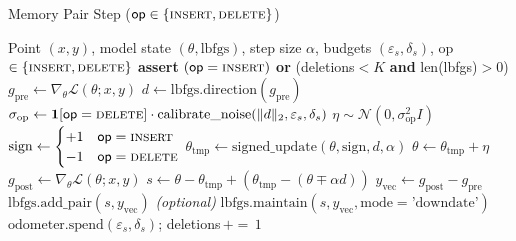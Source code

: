 \documentclass{article}
\theoremstyle{ssltheorem}
\begin{document}
\begin{algorithm}
\caption{Memory Pair Step ($\mathsf{op}\in\{\textsc{insert},\textsc{delete}\}$)}
\label{alg:pair-step}
\begin{algorithmic}
\Require Point $(x,y)$, model state $(\theta,\mathrm{lbfgs})$, step size $\alpha$, budgets $(\varepsilon_s,\delta_s)$, op $\in\{\textsc{insert},\textsc{delete}\}$
\State \textbf{assert} $(\mathsf{op}=\textsc{insert})$ \textbf{or} (deletions$<K$ \textbf{and} len(lbfgs)$>0$)
\State $g_{\text{pre}} \gets \nabla_{\theta}\mathcal{L}(\theta; x,y)$ 
\State $d \gets \mathrm{lbfgs.direction}(g_{\text{pre}})$ 
\State $\sigma_{\text{op}} \gets \mathbf{1}[\mathsf{op}=\textsc{delete}] \cdot \mathrm{calibrate\_noise}(\|d\|_2,\varepsilon_s,\delta_s)$
\State $\eta \sim \mathcal{N}(0,\sigma_{\text{op}}^{2} I)$ 
\State $\mathrm{sign} \gets \begin{cases} +1 & \mathsf{op}=\textsc{insert} \\ -1 & \mathsf{op}=\textsc{delete}\end{cases}$
\State $\theta_{\text{tmp}} \gets \mathrm{signed\_update}(\theta,\mathrm{sign},d,\alpha)$ 
\State $\theta \gets \theta_{\text{tmp}} + \eta$ 
\State $g_{\text{post}} \gets \nabla_{\theta}\mathcal{L}(\theta;
x,y)$ 
\State $s \gets \theta - \theta_{\text{tmp}} + (\theta_{\text{tmp}} - (\theta \mp \alpha d))$ 
\State $y_{\text{vec}} \gets g_{\text{post}} - g_{\text{pre}}$ 
  \State $\mathrm{lbfgs.add\_pair}(s, y_{\text{vec}})$ 
\Else
  \State \textit{(optional)} $\mathrm{lbfgs.maintain}(s, y_{\text{vec}},\text{mode}=\text{'downdate'})$ 
  \State $\mathrm{odometer.spend}(\varepsilon_s,\delta_s)$;
deletions$\,{+}{=}\,1$
\EndIf
\end{algorithmic}
\end{algorithm}
\end{document}
